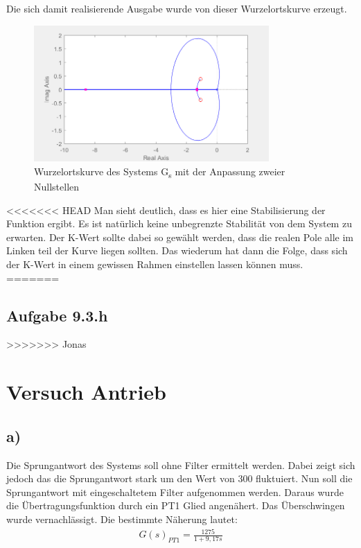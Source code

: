 \documentclass[10pt]{scrartcl}
\begin{document}
Die sich damit realisierende Ausgabe wurde von dieser Wurzelortskurve erzeugt.
\begin{figure}[H]
	\centering
	\includegraphics[width=0.8\textwidth]{WOZ9f3}
	\caption{Wurzelortskurve des Systems G\textsubscript{s} mit der Anpassung zweier Nullstellen}
	\label{img:grafik-dummy}
\end{figure}

<<<<<<< HEAD
Man sieht deutlich, dass es hier eine Stabilisierung der Funktion ergibt. Es ist natürlich keine unbegrenzte Stabilität von dem System zu erwarten. Der K-Wert sollte dabei so gewählt werden, dass die realen Pole alle im Linken teil der Kurve liegen sollten. Das wiederum hat dann die Folge, dass sich der K-Wert in einem gewissen Rahmen einstellen lassen können muss.
=======
\subsection{Aufgabe 9.3.h}
>>>>>>> Jonas

\section{Versuch Antrieb}
\subsection{a)}	Die Sprungantwort des Systems soll ohne Filter ermittelt werden. Dabei zeigt sich jedoch das die Sprungantwort stark um den Wert von 300 fluktuiert.
	Nun soll die Sprungantwort mit eingeschaltetem Filter aufgenommen werden. Daraus wurde die Übertragungsfunktion durch ein PT1 Glied angenähert. Das Überschwingen wurde vernachlässigt. Die bestimmte Näherung lautet: 
\begin{align}
   G(s)_{PT1}=\frac{1275}{1+9,17s}
\end{align}
\end{document}
